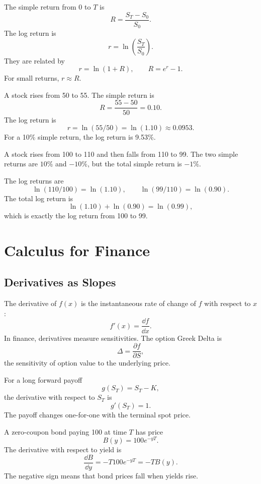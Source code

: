 The simple return from $0$ to $T$ is
\[
    R=\frac{S_T-S_0}{S_0}.
\]
The log return is
\[
    r=\ln\left(\frac{S_T}{S_0}\right).
\]
They are related by
\[
    r=\ln(1+R), \qquad R=e^r-1.
\]
For small returns, $r\approx R$.

\begin{exmp}
A stock rises from 50 to 55. The simple return is
\[
    R=\frac{55-50}{50}=0.10.
\]
The log return is
\[
    r=\ln(55/50)=\ln(1.10)\approx 0.0953.
\]
For a 10\% simple return, the log return is 9.53\%.
\end{exmp}

\begin{exmp}
A stock rises from 100 to 110 and then falls from 110 to 99. The two simple
returns are $10\%$ and $-10\%$, but the total simple return is $-1\%$.

The log returns are
\[
    \ln(110/100)=\ln(1.10),
    \qquad
    \ln(99/110)=\ln(0.90).
\]
The total log return is
\[
    \ln(1.10)+\ln(0.90)=\ln(0.99),
\]
which is exactly the log return from 100 to 99.
\end{exmp}

\section{Calculus for Finance}

\subsection{Derivatives as Slopes}

The derivative of $f(x)$ is the instantaneous rate of change of $f$ with respect
to $x$:
\[
    f'(x)=\frac{\dd f}{\dd x}.
\]
In finance, derivatives measure sensitivities. The option Greek Delta is
\[
    \Delta=\frac{\partial f}{\partial S},
\]
the sensitivity of option value to the underlying price.

\begin{exmp}
For a long forward payoff
\[
    g(S_T)=S_T-K,
\]
the derivative with respect to $S_T$ is
\[
    g'(S_T)=1.
\]
The payoff changes one-for-one with the terminal spot price.
\end{exmp}

\begin{exmp}
A zero-coupon bond paying 100 at time $T$ has price
\[
    B(y)=100e^{-yT}.
\]
The derivative with respect to yield is
\[
    \frac{\dd B}{\dd y}=-T100e^{-yT}=-TB(y).
\]
The negative sign means that bond prices fall when yields rise.
\end{exmp}

